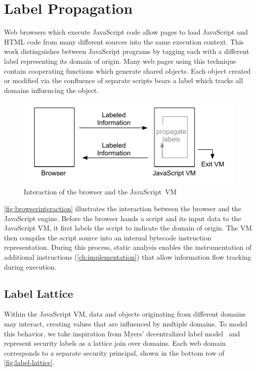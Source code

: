 
\chapter{Label Propagation}
\label{ch:label-propagation}

Web browsers which execute JavaScript code allow pages to load JavaScript and HTML code from many different sources into the same execution context.
This work distinguishes between JavaScript programs by tagging each with a different label representing its domain of origin.
Many web pages using this technique contain cooperating functions which generate shared objects.
Each object created or modified via the confluence of separate scripts bears a label which tracks all domains influencing the object.

\begin{figure}[ht]
  \centerline{\includegraphics[keepaspectratio=true]{images/browserinteraction.pdf}}
  \caption{Interaction of the browser and the JavaScript~VM}
  \label{fig:browserinteraction}
\end{figure}

\autoref{fig:browserinteraction} illustrates the interaction between the browser and the JavaScript engine.
Before the browser hands a script and its input data to the JavaScript VM, it first labels the script to indicate the domain of origin.
The VM then compiles the script source into an internal bytecode instruction representation.
During this process, static analysis enables the instrumentation of additional instructions (\autoref{ch:implementation}) that allow information flow tracking during execution.

\section{Label Lattice}
\label{sec:label-lattice}

Within the JavaScript VM, data and objects originating from different domains may interact, creating values that are influenced by multiple domains.
To model this behavior, we take inspiration from Myers' decentralized label model~\cite{myers.liskov+00} and represent security labels as a lattice join over domains.
Each web domain corresponds to a separate security principal, shown in the bottom row of \autoref{fig:label-lattice}.

